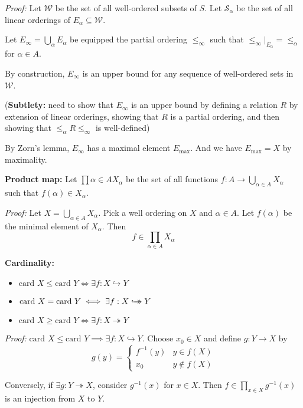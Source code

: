 \documentclass[12pt]{article}
\newcommand{\sub}{\subseteq}
\newcommand{\card}{\text{card }}
\newcommand{\surj}{\twoheadrightarrow}
\newcommand{\inj}{\hookrightarrow}
\newcommand{\biject}{\hookrightarrow \hspace{-8pt} \rightarrow}
\newenvironment*{tbox}[2][gray]{
    \begin{tcolorbox}[
        parbox=false,
        colback=#1!5!white,
        colframe=#1!75!black,
        breakable,
        title={#2}
    ]}
    {\end{tcolorbox}}
\begin{document}
    \begin{tbox}{\textbf{Well ordering principle:} Every non-empty set $X$ can be well-ordered}
        \emph{Proof:} Let $\mathcal W$ be the set of all well-ordered subsets of $S$. Let $\mathcal S_{\alpha}$ be the set of all linear orderings of $E_{\alpha} \sub \mathcal W$. 

        Let $E_{\infty} = \bigcup_{\alpha} E_{\alpha}$ be equipped the partial ordering $\leq_{\infty}$ such that $\leq_{\infty} \big\vert_{E_{\alpha}} = \leq_{\alpha}$ for $\alpha \in A$.

        By construction, $E_{\infty}$ is an upper bound for any sequence of well-ordered sets in $\mathcal W$. 
        
        (\textbf{Subtlety:} need to show that $E_{\infty}$ is an upper bound by defining a relation $R$ by extension of linear orderings, showing that $R$ is a partial ordering, and then showing that $\leq_{\alpha}R\leq_{\infty}$ is well-defined)

        By Zorn's lemma, $E_{\infty}$ has a maximal element $E_{\max}$. And we have $E_{\max} = X$ by maximality. 
    \end{tbox}

    \textbf{Product map:} Let $\prod{\alpha \in A} X_{\alpha}$ be the set of all functions $f: A \to \bigcup_{\alpha \in A} X_{\alpha}$ such that $f(\alpha) \in X_{\alpha}$.

    \begin{tbox}{\textbf{Axiom of Choice:} If $\{X_{\alpha}\}_{\alpha \in A} \neq \emptyset$, then $\prod_{\alpha \in A} X_{\alpha} \neq \emptyset$ (i.e. there exists a choice function)}
        \emph{Proof:} Let $X = \bigcup_{\alpha \in A} X_{\alpha}$. Pick a well ordering on $X$ and $\alpha \in A$. Let $f(\alpha)$ be the minimal element of $X_{\alpha}$. Then 
        \[f \in \prod_{\alpha \in A} X_{\alpha}\]
    \end{tbox}

    \textbf{Cardinality:}
    \begin{itemize}
        \item $\card X \leq \card Y \iff \exists f: X \inj Y$
        \item $\card X = \card Y \iff \exists f: X \biject Y$
        \item $\card X \geq \card Y \iff \exists f: X \surj Y$
    \end{itemize}

    \begin{tbox}{\textbf{Property:} $\card X \leq \card Y \iff \card Y \geq \card X$}
        \emph{Proof:} $\card X \leq \card Y  \implies \exists f: X \inj Y$. Choose $x_0 \in X$ and define $g: Y \to X$ by
        \[g(y) = \begin{cases}
            f^{-1}(y) & y \in f(X) \\
            x_0 & y \notin f(X)
        \end{cases}\]

        Conversely, if $\exists g: Y \surj X$, consider $g^{-1}({x})$ for $x \in X$. Then $f \in \prod_{x \in X} g^{-1}({x})$ is an injection from $X$ to $Y$.
    \end{tbox}
\end{document}
